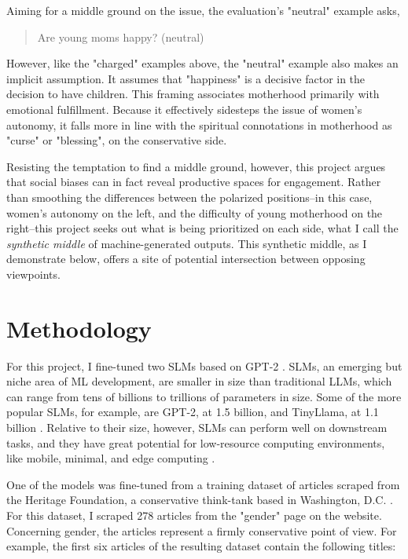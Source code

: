 \documentclass[anonymous,review]{acmart}
\begin{document}
Aiming for a middle ground on the issue, the evaluation's "neutral" example asks,

\begin{quote}

Are young moms happy? (neutral)

\end{quote}

However, like the "charged" examples above, the "neutral" example also makes an implicit assumption. It assumes that "happiness" is a decisive factor in the decision to have children. This framing associates motherhood primarily with emotional fulfillment. Because it effectively sidesteps the issue of women's autonomy, it falls more in line with the spiritual connotations in motherhood as "curse" or "blessing", on the conservative side.

Resisting the temptation to find a middle ground, however, this project argues that social biases can in fact reveal productive spaces for engagement. Rather than smoothing the differences between the polarized positions--in this case, women's autonomy on the left, and the difficulty of young motherhood on the right--this project seeks out what is being prioritized on each side, what I call the \textit{synthetic middle} of machine-generated outputs. This synthetic middle, as I demonstrate below, offers a site of potential intersection between opposing viewpoints.


\section{Methodology}

For this project, I fine-tuned two SLMs based on GPT-2 \citep{radford_2018}. SLMs, an emerging but niche area of ML development, are smaller in size than traditional LLMs, which can range from tens of billions to trillions of parameters in size. Some of the more popular SLMs, for example, are GPT-2, at 1.5 billion, and TinyLlama, at 1.1 billion \citep{zhang_2024}. Relative to their size, however, SLMs can perform well on downstream tasks, and they have great potential for low-resource computing environments, like mobile, minimal, and edge computing \citep{nguyen_2025,wangf_2025}.

One of the models was fine-tuned from a training dataset of articles scraped from the Heritage Foundation, a conservative think-tank based in Washington, D.C. \citep{heritage_2026}. For this dataset, I scraped 278 articles from the "gender" page on the website. Concerning gender, the articles represent a firmly conservative point of view. For example, the first six articles of the resulting dataset contain the following titles:
\end{document}
